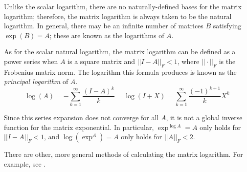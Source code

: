 \documentclass[12pt]{article}
\newcommand{\norm}[1]{\ensuremath{||#1||_F}}
\begin{document}
Unlike the scalar logarithm, there are no naturally-defined bases for the matrix logarithm; therefore, the matrix logarithm is always taken to be the natural logarithm.  In general, there may be an infinite number of matrices $B$ satisfying $\exp(B)=A$; these are known as the logarithms of $A$.

As for the scalar natural logarithm, the matrix logarithm can be defined as a power series when $A$ is a square matrix and $\norm{I-A} < 1$, where $\norm{\cdot}$ is the Frobenius matrix norm.  The logarithm this formula produces is known as the \emph{principal logarithm} of $A$.
\begin{equation*}
\log(A) = -\sum_{k=1}^\infty \frac{(I-A)^k}{k} =\log(I+X) = \sum_{k=1}^\infty \frac{(-1)^{k+1}}{k} X^k
\end{equation*}

Since this series expansion does not converge for all $A$, it is not a global inverse function for the matrix exponential.  In particular, $\exp^{\log A}=A$ only holds for $\norm{I-A} < 1$, and $\log(\exp^A)=A$ only holds for $\norm{A} < 2$.

There are other, more general methods of calculating the matrix logarithm.  For example, see .
\end{document}
